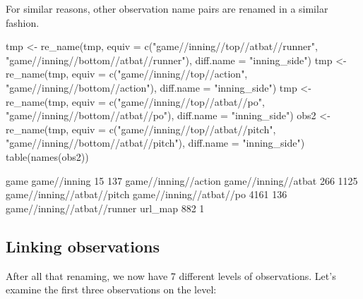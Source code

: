 \documentclass[a4paper]{report}\usepackage[]{graphicx}\usepackage[]{color}
\begin{document}
\begin{article}
\begin{Schunk}
\end{Schunk}


For similar reasons, other observation name pairs are renamed in a
similar fashion.

\begin{Schunk}
\begin{Sinput}
tmp <- re_name(tmp, equiv = c("game//inning//top//atbat//runner",                             
  "game//inning//bottom//atbat//runner"), diff.name = "inning_side")
tmp <- re_name(tmp, equiv = c("game//inning//top//action",                             
  "game//inning//bottom//action"), diff.name = "inning_side")  
tmp <- re_name(tmp, equiv = c("game//inning//top//atbat//po",                            
  "game//inning//bottom//atbat//po"), diff.name = "inning_side")
obs2 <- re_name(tmp, equiv = c("game//inning//top//atbat//pitch",                             
  "game//inning//bottom//atbat//pitch"), diff.name = "inning_side") 
table(names(obs2))
\end{Sinput}
\begin{Soutput}

                       game                game//inning 
                         15                         137 
       game//inning//action         game//inning//atbat 
                        266                        1125 
 game//inning//atbat//pitch     game//inning//atbat//po 
                       4161                         136 
game//inning//atbat//runner                     url_map 
                        882                           1 
\end{Soutput}
\end{Schunk}



\subsection{Linking observations}

After all that renaming, we now have 7
different levels of observations. Let's examine the first three observations
on the  level:


\end{article}
\end{document}
